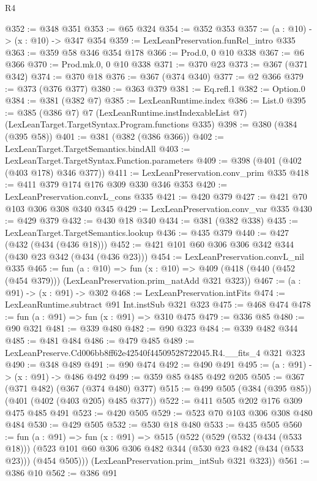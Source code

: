 \begin{lexlean}{R4}
\begin{coremodule}
@352 := @348 @351
@353 := @65 @324
@354 := @352 @353
@357 := (a : @10) -> (x : @10) -> @347 @354
@359 := LexLeanPreservation.funRel_intro @335
@363 := @359 @58 @346 @354 @178
@366 := Prod.{0, 0} @10 @338
@367 := @6 @366
@370 := Prod.mk.{0, 0} @10 @338
@371 := @370 @23
@373 := @367 (@371 @342)
@374 := @370 @18
@376 := @367 (@374 @340)
@377 := @2 @366
@379 := @373 (@376 @377)
@380 := @363 @379
@381 := Eq.refl.{1}
@382 := Option.{0}
@384 := @381 (@382 @7)
@385 := LexLeanRuntime.index
@386 := List.{0}
@395 := @385
    (@386 @7)
    @7
    (LexLeanRuntime.instIndexableList @7)
    (LexLeanTarget.TargetSyntax.Program.functions @335)
@398 := @380 (@384 (@395 @58))
@401 := @381 (@382 (@386 @366))
@402 := LexLeanTarget.TargetSemantics.bindAll
@403 := LexLeanTarget.TargetSyntax.Function.parameters
@409 := @398 (@401 (@402 (@403 @178) @346 @377))
@411 := LexLeanPreservation.conv_prim @335
@418 := @411 @379 @174 @176 @309 @330 @346 @353
@420 := LexLeanPreservation.convL_cons @335
@421 := @420 @379
@427 := @421 @70 @103 @306 @308 @340 @345
@429 := LexLeanPreservation.conv_var @335
@430 := @429 @379
@432 := @430 @18 @340
@434 := @381 (@382 @338)
@435 := LexLeanTarget.TargetSemantics.lookup
@436 := @435 @379
@440 := @427 (@432 (@434 (@436 @18)))
@452 := @421 @101 @60 @306 @306 @342 @344 (@430 @23 @342 (@434 (@436 @23)))
@454 := LexLeanPreservation.convL_nil @335
@465 := fun (a : @10) =>
  fun (x : @10) => @409 (@418 (@440 (@452 (@454 @379))) (LexLeanPreservation.prim_natAdd @321 @323))
@467 := (a : @91) -> (x : @91) -> @302
@468 := LexLeanPreservation.intFits
@474 := LexLeanRuntime.subtract @91 Int.instSub @321 @323
@475 := @468 @474
@478 := fun (a : @91) => fun (x : @91) => @310 @475
@479 := @336 @85
@480 := @90 @321
@481 := @339 @480
@482 := @90 @323
@484 := @339 @482 @344
@485 := @481 @484
@486 := @479 @485
@489 := LexLeanPreserve.Cd006bb8ff62e42540f44509528722045.R4.__fits_4 @321 @323
@490 := @348 @489
@491 := @90 @474
@492 := @490 @491
@495 := (a : @91) -> (x : @91) -> @486 @492
@499 := @359 @85 @485 @492 @205
@505 := @367 (@371 @482) (@367 (@374 @480) @377)
@515 := @499 @505 (@384 (@395 @85)) (@401 (@402 (@403 @205) @485 @377))
@522 := @411 @505 @202 @176 @309 @475 @485 @491
@523 := @420 @505
@529 := @523 @70 @103 @306 @308 @480 @484
@530 := @429 @505
@532 := @530 @18 @480
@533 := @435 @505
@560 := fun (a : @91) =>
  fun (x : @91) =>
  @515
    (@522
      (@529
        (@532 (@434 (@533 @18)))
        (@523 @101 @60 @306 @306 @482 @344 (@530 @23 @482 (@434 (@533 @23))) (@454 @505)))
      (LexLeanPreservation.prim_intSub @321 @323))
@561 := @386 @10
@562 := @386 @91

\end{coremodule}
\end{lexlean}
